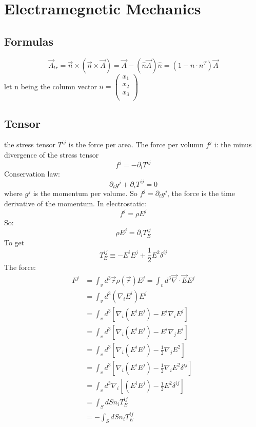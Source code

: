 \chapter{Electramegnetic Mechanics}

\section{Formulas}
\[
    \vec{A}_{tr} = \vec{n}\times(\vec{n}\times\vec{A}) = \vec{A}-(\hat{n}\vec{A})\hat{n} = (\mathcal{1}-n\cdot n^T)\vec{A}
\]
let n being the column vector 
$n=\begin{pmatrix}
    x_1	\\
    x_2	\\
    x_3	\\
\end{pmatrix}$

\section{Tensor}
the stress tensor $T^{ij}$ is the force per area. The force per volumn $f^j$
i: the minus divergence of the stress tensor
\[ f^j = -\partial_iT^{ij} \]
Conservation law:
\[  \partial_tg^j+\partial_iT^{ij} = 0 \]
where $g^j$ is the momentum per volume. So $f^j=\partial_tg^j$, the force is
the time derivative of the momentum.
In electrostatic:
\[  f^j = \rho E^j \]
So:
\[  \rho E^j = \partial_iT_E^{ij} \]
To get 
\[  T_E^{ij} \equiv -E^iE^j + \frac{1}{2}E^2\delta^{ij} \]
The force:
\begin{equation*}
\begin{aligned}  
    F^j &= \int_v d^3\vec{r}\rho(\vec{r})E^j = \int_v d^3\vec{\nabla}\cdot\vec{E}E^j	\\
	&= \int_v d^3(\nabla_iE^i)E^j \\
	&= \int_v d^3 [\nabla_i(E^iE^j) - E^i\nabla_iE^j ] \\
	&= \int_v d^3 [\nabla_i(E^iE^j) - E^i\nabla_jE^i ] \\
	&= \int_v d^3 [\nabla_i(E^iE^j) - \frac{1}{2}\nabla_jE^2 ] \\
	&= \int_v d^3 [\nabla_i(E^iE^j) - \frac{1}{2}\nabla_iE^2\delta^{ij} ] \\
	&= \int_v d^3 \nabla_i [(E^iE^j) - \frac{1}{2}E^2\delta^{ij} ] \\
	&= \int_S dS n_i T_E^{ij} \\
	&= -\int_S dS n_i T_E^{ij} 
\end{aligned}  
\end{equation*}

